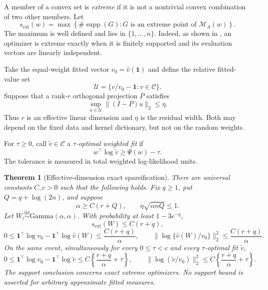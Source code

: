 \documentclass[11pt]{article}
\newtheorem{theorem}{Theorem}[section]
\theoremstyle{definition}
\theoremstyle{remark}
\DeclareMathOperator{\supp}{supp}
\newcommand{\Mcal}{\mathcal M}
\newcommand{\Ccal}{\mathcal C}
\newcommand{\Ucal}{\mathcal U}
\newcommand{\one}{\bm 1}
\newcommand{\norm}[1]{\lVert #1\rVert}
\newcommand{\vhat}{\widehat v}
\newcommand{\vtil}{\widetilde v}
\begin{document}
A member of a convex set is \emph{extreme} if it is not a nontrivial convex
combination of two other members.  Let
\begin{equation}\label{eq:sext}
 s_{\mathrm{ext}}(w)=
 \max\left\{\#\supp(G):G\text{ is an extreme point of }\Mcal_A(w)\right\}.
\end{equation}
The maximum is well defined and lies in $\{1,\ldots,n\}$.  Indeed, as shown in
, an optimizer is extreme exactly when it is finitely
supported and its evaluation vectors are linearly independent.

Take the equal-weight fitted vector $v_0=\vhat(\one)$ and define the relative
fitted-value set
\begin{equation}\label{eq:relative-set}
 \Ucal=\{v/v_0-\one:v\in\Ccal\}.
\end{equation}
Suppose that a rank-$r$ orthogonal projection $P$ satisfies
\begin{equation}\label{eq:width}
 \sup_{u\in\Ucal}\norm{(I-P)u}_2\le\eta.
\end{equation}
Thus $r$ is an effective linear dimension and $\eta$ is the residual width.
Both may depend on the fixed data and kernel dictionary, but not on the random
weights.

For $\tau\ge0$, call $\vtil\in\Ccal$ a \emph{$\tau$-optimal weighted fit} if
\begin{equation}\label{eq:tau-opt}
 w^\top\log\vtil\ge\Psi(w)-\tau.
\end{equation}
The tolerance is measured in total weighted log-likelihood units.

\begin{theorem}[Effective-dimension exact sparsification]
\label{thm:effective}
There are universal constants $C,c>0$ such that the following holds.  Fix
$q\ge1$, put $Q=q+\log(2n)$, and suppose
\begin{equation}\label{eq:effective-conditions}
 \alpha\ge C(r+Q),
 \qquad
 \eta\sqrt{\alpha nQ}\le1.
\end{equation}
Let $W_i\stackrel{\mathrm{iid}}\sim\mathrm{Gamma}(\alpha,\alpha)$.  With
probability at least $1-3e^{-q}$,
\begin{equation}\label{eq:effective-support}
 s_{\mathrm{ext}}(W)\le C(r+q),
\end{equation}
\begin{equation}\label{eq:effective-exact-fit}
 0\le \one^\top\log v_0-\one^\top\log\vhat(W)
 \le\frac{C(r+q)}{\alpha},
 \qquad
 \norm{\log\{\vhat(W)/v_0\}}_2^2
 \le\frac{C(r+q)}{\alpha}.
\end{equation}
On the same event, simultaneously for every $0\le\tau<c$ and every
$\tau$-optimal fit $\vtil$,
\begin{equation}\label{eq:effective-approx-fit}
 0\le \one^\top\log v_0-\one^\top\log\vtil
 \le C\left\{\frac{r+q}{\alpha}+\tau\right\},
 \qquad
 \norm{\log(\vtil/v_0)}_2^2
 \le C\left\{\frac{r+q}{\alpha}+\tau\right\}.
\end{equation}
The support conclusion concerns exact extreme optimizers.  No support bound is
asserted for arbitrary approximate fitted measures.
\end{theorem}
\end{document}
